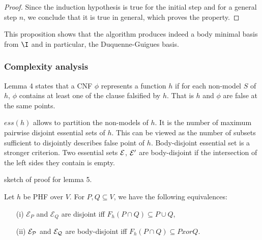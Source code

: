\begin{proof}
\vspace{1.2em}

Since the induction hypothesis is true for the initial step and for a general 
step $n$, we conclude that it is true in general, which proves the property.

\end{proof} 

This proposition shows that the algorithm produces indeed a body minimal basis
from $\I$ and in particular, the Duquenne-Guigues basis. 

\subsubsection{Complexity analysis}


Lemma 4 states that a CNF $\phi$ represents a function $h$ if for each non-model
$S$ of $h$, $\phi$ contains at least one of the clause falsified by $h$. That is
$h$ and $\phi$ are false at the same points.

$ess(h)$ allows to partition the non-models of $h$. It is the number of maximum
pairwise disjoint essential sets of $h$. This can be viewed as the number of
subsets sufficient to disjointly describes false point of $h$. Body-disjoint 
essential set is a stronger criterion. Two essential sets $\cal{E}$, $\cal{E}'$
are body-disjoint if the intersection of the left sides they contain is empty.

sketch of proof for lemma 5. 

\begin{lemma} Let $h$ be PHF over $V$. For $P, Q \subseteq V$, we have the 
following equivalences:

\begin{itemize}
	\item[(i)] $\mathcal{E}_P$ and $\mathcal{E}_Q$ are disjoint iff $F_h(P \cap
		Q) \subseteq P \cup Q$,
	
	\item[(ii)] $\cal{E}_P$ and $\cal{E}_Q$ are body-disjoint iff $F_h(P
	 	\cap Q) \subseteq P xor Q$.
\end{itemize}
	
\end{lemma} 


